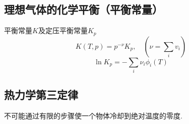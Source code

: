 
\subsection{理想气体的化学平衡（平衡常量）}
平衡常量$K$及定压平衡常量$K_p$
\[
K(T,p) = p^{-\nu}K_p, \quad (\nu=\sum_i v_i)
\]
\[
\ln K_p = -\sum_i \nu_i\phi_i(T)
\]


\subsection{热力学第三定律}
不可能通过有限的步骤使一个物体冷却到绝对温度的零度.
